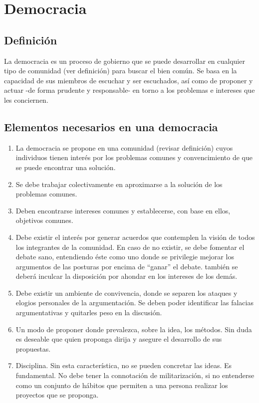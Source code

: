 \documentclass[10pt,letterpaper]{book}
\begin{document}
	\section{Democracia} 

		\subsection{Definición}
La democracia es un proceso de gobierno que se puede desarrollar en cualquier tipo de comunidad (ver definición) para buscar el bien común. Se basa en la capacidad de sus miembros de escuchar y ser escuchados, así como de proponer y actuar -de forma prudente y responsable- en torno a los problemas e intereses que les conciernen.
	\vspace{-0.3cm}
		\subsection{Elementos necesarios en una democracia}	
			\begin{enumerate}[label=\alph*]
			\item La democracia se propone en una comunidad (revisar definición) cuyos individuos tienen interés por los problemas comunes y convencimiento de que se puede encontrar una solución.
			\item Se debe trabajar colectivamente en aproximarse a la solución de los problemas comunes.
			\item Deben encontrarse intereses comunes y establecerse, con base en ellos, objetivos comunes.
			\item Debe existir el interés por generar acuerdos que contemplen la visión de todos los integrantes de la comunidad. En caso de no existir, se debe fomentar el debate sano, entendiendo éste como uno donde se privilegie mejorar los argumentos de las posturas por encima de ``ganar'' el debate. también se deberá inculcar la disposición por ahondar en los intereses de los demás.
			\item Debe existir un ambiente de convivencia, donde se separen los ataques y elogios personales de la argumentación. Se deben poder identificar las falacias argumentativas y quitarles peso en la discusión.
			\item Un modo de proponer donde prevalezca, sobre la idea, los métodos. Sin duda es deseable que quien proponga dirija y asegure el desarrollo de sus propuestas.
			\item Disciplina. Sin esta característica, no se pueden concretar las ideas. Es fundamental. No debe tener la connotación de militarización, si no entenderse como un conjunto de hábitos que permiten a una persona realizar los proyectos que se proponga.
			\end{enumerate}
	\vspace{-0.3cm}	
\end{document}
